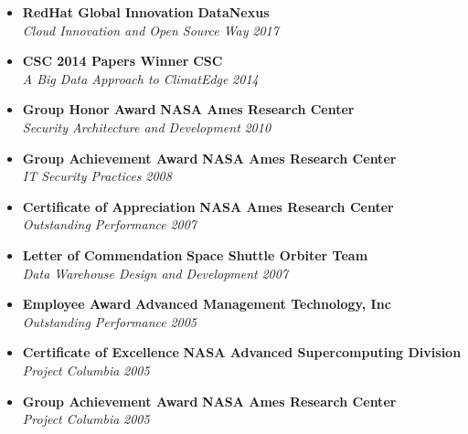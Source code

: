 \begin{itemize}
	\parskip=0.1em
	\item
	\headerrow
		{\textbf{RedHat Global Innovation}}
		{\textbf{DataNexus}}
	\\
	\headerrow
		{\emph{Cloud Innovation and Open Source Way}}
		{\emph{2017}}

  \item
	\headerrow
		{\textbf{CSC 2014 Papers Winner}}
		{\textbf{CSC}}
	\\
	\headerrow
		{\emph{A Big Data Approach to ClimatEdge\texttrademark}}
		{\emph{2014}}

	\item
	\headerrow
		{\textbf{Group Honor Award}}
		{\textbf{NASA Ames Research Center}}
	\\
	\headerrow
		{\emph{Security Architecture and Development}}
		{\emph{2010}}

	\item
	\headerrow
		{\textbf{Group Achievement Award}}
		{\textbf{NASA Ames Research Center}}
	\\
	\headerrow
		{\emph{IT Security Practices}}
		{\emph{2008}}

	\item
	\headerrow
		{\textbf{Certificate of Appreciation}}
		{\textbf{NASA Ames Research Center}}
	\\
	\headerrow
		{\emph{Outstanding Performance}}
		{\emph{2007}}

	\item
	\headerrow
		{\textbf{Letter of Commendation}}
		{\textbf{Space Shuttle Orbiter Team}}
	\\
	\headerrow
		{\emph{Data Warehouse Design and Development}}
		{\emph{2007}}

	\item
	\headerrow
		{\textbf{Employee Award}}
		{\textbf{Advanced Management Technology, Inc}}
	\\
	\headerrow
		{\emph{Outstanding Performance}}
		{\emph{2005}}

	\item
	\headerrow
		{\textbf{Certificate of Excellence}}
		{\textbf{NASA Advanced Supercomputing Division}}
	\\
	\headerrow
		{\emph{Project Columbia}}
		{\emph{2005}}

	\item
	\headerrow
		{\textbf{Group Achievement Award}}
		{\textbf{NASA Ames Research Center}}
	\\
	\headerrow
		{\emph{Project Columbia}}
		{\emph{2005}}


\end{itemize}
